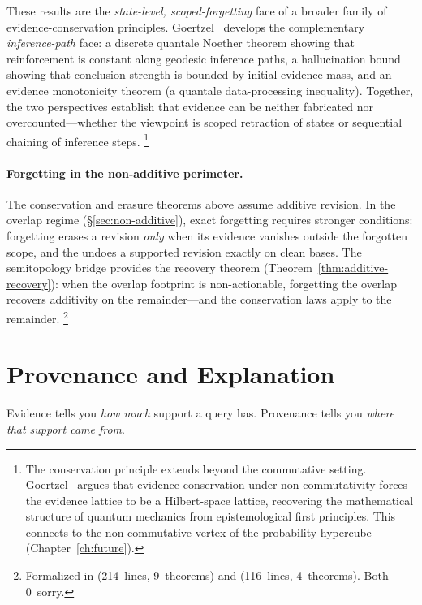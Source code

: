 \documentclass[11pt,openany]{report}
\begin{document}
These results are the \emph{state-level, scoped-forgetting} face of
a broader family of evidence-conservation principles.
Goertzel~\cite{GoertzelEvidenceConservation2026} develops the
complementary \emph{inference-path} face: a discrete quantale Noether
theorem showing that reinforcement is constant along geodesic
inference paths, a hallucination bound showing that conclusion
strength is bounded by initial evidence mass, and an evidence
monotonicity theorem (a quantale data-processing inequality).
Together, the two perspectives establish that evidence can be neither
fabricated nor overcounted---whether the viewpoint is scoped
retraction of states or sequential chaining of inference steps.%
\footnote{The conservation principle extends beyond the commutative
setting.  Goertzel~\cite{GoertzelQMEvidence2026} argues that
evidence conservation under non-commutativity forces the evidence
lattice to be a Hilbert-space lattice, recovering the mathematical
structure of quantum mechanics from epistemological first principles.
This connects to the non-commutative vertex of the probability
hypercube (Chapter~\ref{ch:future}).}

\paragraph{Forgetting in the non-additive perimeter.}
The conservation and erasure theorems above assume additive
revision.  In the overlap regime
(\S\ref{sec:non-additive}), exact forgetting requires stronger
conditions: forgetting erases a revision \emph{only} when its evidence
vanishes outside the forgotten scope, and the
 undoes a supported revision
exactly on clean bases.  The semitopology bridge
provides the recovery theorem
(Theorem~\ref{thm:additive-recovery}): when the overlap footprint
is non-actionable, forgetting the overlap recovers additivity on
the remainder---and the conservation laws apply to the
remainder.%
\footnote{Formalized in
(214~lines, 9~theorems) and
(116~lines, 4~theorems).  Both 0~sorry.}


\section{Provenance and Explanation}
\label{sec:provenance}

Evidence tells you \emph{how much} support a query has.  Provenance
tells you \emph{where that support came from}.
\end{document}

